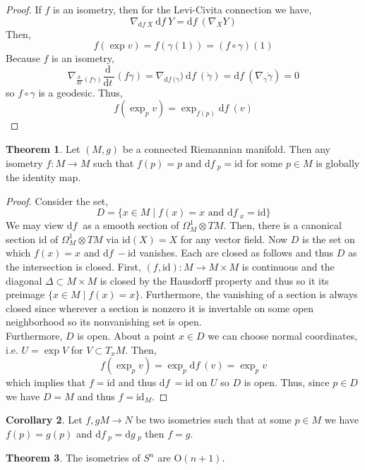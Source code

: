 \documentclass[12pt]{extarticle}
\newcommand{\id}{\mathrm{id}}
\renewcommand{\d}[1]{ \mathrm{d}#1 \:}
\newcommand{\deriv}[2]{\frac{\d{#1}}{\d{#2}}}
\theoremstyle{definition}
\newtheorem{theorem}{Theorem}[section]
\newtheorem{corollary}[theorem]{Corollary}
\newcommand{\Orth}[1]{\mathrm{O}\left(#1\right)}
\begin{document}
\begin{proof}
If $f$ is an isometry, then for the Levi-Civita connection we have,
\[ \nabla_{\d{f} X} \: \d{f} Y = \d{f} \left( \nabla_X Y \right) \]
Then,
\[ f(\exp{v}) = f (\gamma(1)) = (f \circ \gamma)(1) \]
Because $f$ is an isometry,
\[ \nabla_{\deriv{}{t}(f \gamma)} \deriv{}{t}(f\gamma) = \nabla_{\d{f} (\dot{\gamma}}) \: \d{f} (\dot{\gamma}) = \d{f} \left( \nabla_{\dot{\gamma}} \dot{\gamma} \right) = 0 \]
so $f \circ \gamma$ is a geodesic. Thus,
\[ f(\exp_p{v}) = \exp_{f(p)}{\d{f}(v)} \]
\end{proof}

\begin{theorem}
Let $(M, g)$ be a connected Riemannian manifold. Then any isometry $f : M \to M$ such that $f(p) = p$ and $\d{f}_p = \id$ for some $p \in M$ is globally the identity map. 
\end{theorem}

\begin{proof}
Consider the set,
\[ D = \{ x \in M \mid f(x) = x \text{ and } \d{f}_x = \id \} \]
We may view $\d{f}$ as a smooth section of $\Omega^1_M \otimes TM$. Then, there is a canonical section $\id$ of $\Omega^1_M \otimes TM$ via $\id(X) = X$ for any vector field. Now $D$ is the set on which $f(x) = x$ and $\d{f} - \id$ vanishes. Each are closed as follows and thus $D$ as the intersection is closed. First, $(f, \id) : M \to M \times M$ is continuous and the diagonal $\Delta \subset M \times M$ is closed by the Hausdorff property and thus so it its preimage $\{ x \in M \mid f(x) = x \}$. Furthermore, the vanishing of a section is always closed since wherever a section is nonzero it is invertable on some open neighborhood so its nonvanishing set is open.
\bigskip\\
Furthermore, $D$ is open. About a point $x \in D$ we can choose normal coordinates, i.e. $U = \exp{V}$ for $V \subset T_x M$. Then,
\[ f(\exp_p{v}) = \exp_p{\d{f}(v)} = \exp_p{v} \]
which implies that $f = \id$ and thus $\d{f} = \id$ on $U$ so $D$ is open.
Thus, since $p \in D$ we have $D = M$ and thus $f = \id_M$. 
\end{proof}

\begin{corollary}
Let $f,g M \to N$ be two isometries such that at some $p \in M$ we have $f(p) = g(p)$ and $\d{f}_p = \d{g}_p$ then $f = g$. 
\end{corollary}

\begin{theorem}
The isometries of $S^n$ are $\Orth{n+1}$. 
\end{theorem}
\end{document}
